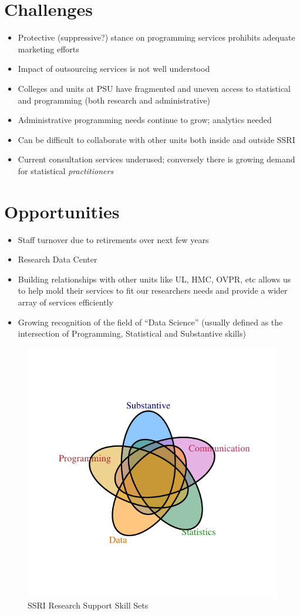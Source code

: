 \documentclass{article}
\begin{document}
\section*{Challenges}
\begin{itemize}
  \item Protective (suppressive?) stance on programming services prohibits adequate marketing efforts
  \item Impact of outsourcing services is not well understood
  \item Colleges and units at PSU have fragmented and uneven access to statistical and programming (both research and administrative)  
  \item Administrative programming needs continue to grow; analytics needed  
  \item Can be difficult to collaborate with other units both inside and outside SSRI
  \item Current consultation services underused; conversely there is growing demand for statistical \emph{practitioners}
\end{itemize}

\section*{Opportunities}
\begin{itemize}
  \item Staff turnover due to retirements over next few years
  \item Research Data Center 
  \item Building relationships with other units like UL, HMC, OVPR, etc allows us to help mold their services to fit our researchers needs and provide a wider array of services efficiently  
  \item Growing recognition of the field of ``Data Science'' (usually defined as the intersection of Programming, Statistical and Substantive skills)
\end{itemize}


\begin{figure}[h]
\begin{center}
\includegraphics{vennDiagram-002}

\caption{SSRI Research Support Skill Sets}
\end{center}
\end{figure}
\end{document}
